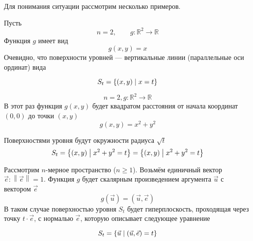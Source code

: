 Для понимания ситуации рассмотрим несколько примеров.

\begin{example}
  Пусть
  \begin{equation*}
    n=2,\qquad g: \mathbb{R}^2 \rightarrow \mathbb{R}
  \end{equation*}
  Функция $g$ имеет вид
  $$g\left( x, y \right) = x$$
  Очевидно, что поверхности уровней --- вертикальные линии
  (параллельные оси ординат) вида

  \begin{equation*}
    S_t = \left\{ \left( x, y \right) \;\middle|\; x = t \right\}
  \end{equation*}
\end{example}

\begin{example}
  $$n=2, g: \mathbb{R}^2 \rightarrow \mathbb{R}$$
  В этот раз функция $g\left( x, y \right)$ будет квадратом расстояния
  от начала координат $\left( 0, 0 \right)$ до точки $\left( x, y \right)$
  $$g\left( x, y \right) = x^2 + y^2$$

  Поверхностями уровня будут окружности радиуса $\sqrt{t}$
  \begin{equation*}
    S_t
      = \left\{ \left( x, y \right) \;\middle|\; x^2 + y^2 = t \right\}
      = \left\{ \left( x, y \right) \;\middle|\; x^2 + y^2 = t \right\}
  \end{equation*}
\end{example}

\begin{example}
  Рассмотрим $n$-мерное пространство ($n \ge 1$).
  Возьмём единичный вектор $\vec{e}: \left\| \vec{e} \right\| = 1$.
  Функция $g$ будет скалярным произведением аргумента $\vec{u}$
  с вектором $\vec{e}$
      $$g\left( \vec{u} \right) = \left( \vec{u}, \vec{e} \right)$$
  В таком случае поверхностью уровня $S_t$ будет гиперплоскость,
  проходящая через точку $t \cdot \vec{e}$, с нормалью $\vec{e}$,
  которую описывает следующее уравнение
  \begin{comment}\footnote{
      Уравнение гиперплоскости с нормалью $\vec{e}$,
      проходящую через точку с радиус-вектором $\vec{x}$,
      выглядит следующим образом
      $$\left( \vec{u}, \vec{e} \right) = \left( \vec{x}, \vec{e} \right)$$

      Вследствие линейности скалярного произведения получаем
      $$\left( t \cdot \vec{e}, \vec{e} \right)
      = t \cdot \left( \vec{e}, \vec{e} \right) = t$$

      Значит, указав $\vec{x} = t \cdot \vec{e}$, получим уравнение,
      данное в примере
      $$\left( \vec{u}, \vec{e} \right)
      = \left( \vec{x}, \vec{e} \right)
      = \left( t \cdot \vec{e}, \vec{e} \right)
      = t \cdot \left( \vec{e}, \vec{e} \right) = t$$}
      \end{comment}
  $$S_t = \left\{ \vec{u} \;\middle|\; \left( \vec{u}, \vec{e} \right) = t \right\}$$
\end{example}

